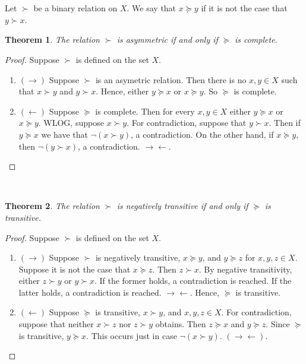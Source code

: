 \documentclass[12pt]{article}
\newtheorem{thm}{Theorem}[section]
\theoremstyle{definition}
\theoremstyle{remark}
\def\contra{\rightarrow \leftarrow}
\begin{document}
\maketitle
%
%
\section{}
Let $\succ$ be a binary relation on $X$. We say that $x \succeq y$ if it is not the case that $y \succ x$.
\begin{thm}
  The relation $\succ$ is asymmetric if and only if $\succeq$ is complete.
\end{thm}
\begin{proof} Suppose $\succ$ is defined on the set $X$.
  \begin{enumerate}
    \item $(\rightarrow)$ Suppose $\succ$ is an asymetric relation. Then there is no $x, y \in X$ such that $x \succ y$ and $y \succ x$. Hence, either $y \succeq x$ or $x \succeq y$. So $\succeq$ is complete.
    \item $(\leftarrow)$ Suppose $\succeq$ is complete. Then for every $x, y \in X$ either $y \succeq x$ or $x \succeq y$. WLOG, suppose $x \succ y$. For contradiction, suppose that $y \succ x$. Then if $y \succeq x$ we have that $\neg(x \succ y)$, a contradiction. On the other hand, if $x \succeq y$, then $\neg(y \succ x)$, a contradiction. $\contra$.
  \end{enumerate}
\end{proof} 
\begin{thm}
  The relation $\succ$ is negatively transitive if and only if $\succeq$ is transitive.
\end{thm}
\begin{proof} Suppose $\succ$ is defined on the set $X$.
  \begin{enumerate}
    \item $(\rightarrow)$ Suppose $\succ$ is negatively transitive, $x \succeq y$, and $y \succeq z$ for $x,y,z \in X$. Suppose it is not the case that $x \succeq z$. Then $z \succ x$. By negative transitivity, either $z \succ y$ or $y \succ x$. If the former holds, a contradiction is reached. If the latter holds, a contradiction is reached. $\contra$. Hence, $\succeq$ is transitive.
    \item $(\leftarrow)$ Suppose $\succeq$ is transitive, $x \succ y$, and $x,y,z \in X$. For contradiction, suppose that neither $x \succ z$ nor $z \succ y$ obtains. Then $z \succeq x$ and $y \succeq z$. Since $\succeq$ is transitive, $y \succeq x$. This occurs just in case $\neg(x \succ y)$. $(\contra)$.
  \end{enumerate}
\end{proof}
%
%
\end{document}
